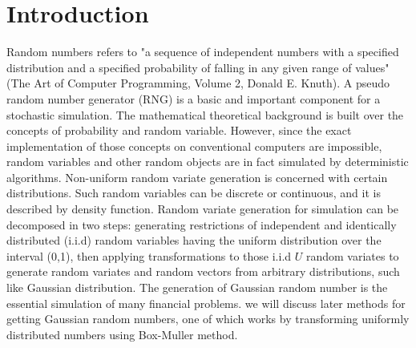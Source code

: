 \documentclass[a4paper,11pt]{article}
\begin{document}

\thispagestyle{empty}





\newpage




\newpage
\tableofcontents
\clearpage



\newpage
\pagestyle{plain}
\setcounter{page}{1}    %


\section{Introduction}

Random numbers refers to "a sequence of independent numbers with a specified distribution and a specified probability of falling in any given range of values" (The Art of Computer Programming, Volume 2, Donald E. Knuth). A pseudo random number generator (RNG) is a basic and important component for a stochastic simulation. The mathematical theoretical background is built over the concepts of probability and random variable. However, since the exact implementation of those concepts on conventional computers are impossible, random variables and other random objects are in fact simulated by deterministic algorithms. Non-uniform random variate generation is concerned with certain distributions. Such random variables can be discrete or continuous, and it is described by density function. Random variate generation for simulation can be decomposed in two steps: generating restrictions of independent and identically distributed (i.i.d) random variables having the uniform distribution over the interval (0,1), then applying transformations to those i.i.d  $U$ random variates to generate random variates and random vectors from arbitrary distributions, such like Gaussian distribution. The generation of Gaussian random number is the essential simulation of many financial problems. we will discuss later methods for getting Gaussian random numbers, one of which works by transforming uniformly distributed numbers using Box-Muller method.\\
\end{document}
